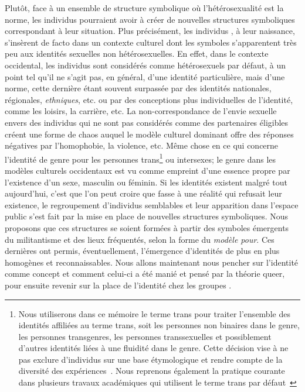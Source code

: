 Plutôt, face à un ensemble de structure symbolique où l'hétérosexualité est la norme, les individus \lgbt{} pourraient avoir à créer de nouvelles structures symboliques correspondant à leur situation.
Plus précisément, les individus \lgbt{}, à leur naissance, s'insèrent de facto dans un contexte culturel dont les symboles s'apparentent très peu aux identités sexuelles non hétérosexuelles.
En effet, dans le contexte occidental, les individus sont considérés comme hétérosexuels par défaut, à un point tel qu'il ne s'agit pas, en général, d'une identité particulière, mais d'une norme, cette dernière étant souvent surpassée par des identités nationales, régionales, \emph{ethniques}, etc. ou par des conceptions plus individuelles de l'identité, comme les loisirs, la carrière, etc.
La non-correspondance de l'envie sexuelle envers des individus qui ne sont pas considérés comme des partenaires éligibles créent une forme de chaos auquel le modèle culturel dominant offre des réponses négatives par l'homophobie, la violence, etc.
Même chose en ce qui concerne l'identité de genre pour les personnes trans\footnote{Nous utiliserons dans ce mémoire le terme trans pour traiter l'ensemble des identités affiliées au terme trans, soit les personnes non binaires dans le genre, les personnes transgenres, les personnes transsexuelles et possiblement d'autres identités liées à une fluidité dans le genre. Cette décision vise à ne pas exclure d'individus sur une base étymologique et rendre compte de la diversité des expériences~\citep[193]{Nash2011}. Nous reprenons également la pratique courante dans plusieurs travaux académiques qui utilisent le terme trans par défaut~\citep[par exemple, voir][]{Pfeffer2014, Rosenberg2014}} ou intersexes; le genre dans les modèles culturels occidentaux est vu comme empreint d'une essence propre par l'existence d'un sexe, masculin ou féminin.
Si les identités \lgbt{} existent malgré tout aujourd'hui, c'est que l'on peut croire que fasse à une réalité qui refusait leur existence, le regroupement d'individus semblables et leur apparition dans l'espace public s'est fait par la mise en place de nouvelles structures symboliques.
Nous proposons que ces structures se soient formées à partir des symboles émergents du militantisme et des lieux fréquentés, selon la forme du \emph{modèle pour}.
Ces dernières ont permis, éventuellement, l'émergence d'identités de plus en plus homogènes et reconnaissables.
Nous allons maintenant nous pencher sur l'identité comme concept et comment celui-ci a été manié et pensé par la théorie queer, pour ensuite revenir sur la place de l'identité chez les groupes \lgbt{}.

